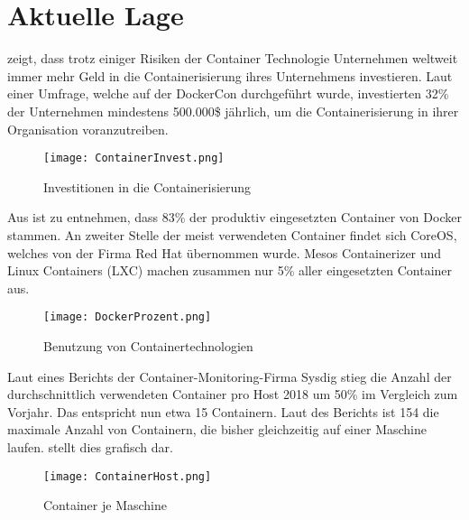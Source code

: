 \newpage
\section{Aktuelle Lage}
\label{sec:AktuelleLage}
 zeigt, dass trotz einiger Risiken der Container Technologie Unternehmen weltweit immer mehr Geld in die Containerisierung ihres Unternehmens investieren. Laut einer Umfrage, welche auf der DockerCon durchgeführt wurde, investierten 32\% der Unternehmen mindestens 500.000\$ jährlich, um die Containerisierung in ihrer Organisation voranzutreiben. \cite{Investments}
\begin{figure}[H]
	\begin{center}
		\texttt{[image: ContainerInvest.png]}
	\end{center}
	\caption[Investitionen in die Containerisierung]{Investitionen in die Containerisierung \footnotemark}
	\label{fig:Stats1}
\end{figure}
\newpage
Aus  ist zu entnehmen, dass 83\% der produktiv eingesetzten Container von Docker stammen. An zweiter Stelle der meist verwendeten Container findet sich CoreOS, welches von der Firma Red Hat übernommen wurde. Mesos Containerizer und Linux Containers (LXC) machen zusammen nur 5\% aller eingesetzten Container aus. \cite{stats}
\begin{figure}[H]
	\begin{center}
		\texttt{[image: DockerProzent.png]}
	\end{center}
	\caption[Benutzung von Containertechnologien]{Benutzung von Containertechnologien \footnotemark}
	\label{fig:Stats2}
\end{figure}
Laut eines Berichts der Container-Monitoring-Firma Sysdig stieg die Anzahl der durchschnittlich verwendeten Container pro Host 2018 um 50\% im Vergleich zum Vorjahr. Das entspricht nun etwa 15 Containern. Laut des Berichts ist 154 die maximale Anzahl von Containern, die bisher gleichzeitig auf einer Maschine laufen.\cite{stats}\newline {} stellt dies grafisch dar.
\begin{figure}[H]
	\begin{center}
		\texttt{[image: ContainerHost.png]}
	\end{center}
	\caption[Container je Maschine]{Container je Maschine \footnotemark}
	\label{fig:Stats3}
\end{figure}
